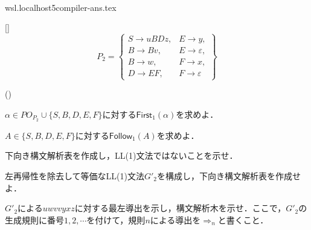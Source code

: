 \\wsl.localhost\Ubuntu-26.04\home\yuen\github\25compiler\exercises\ex241011\ex241011-ans.tex\documentclass[dvipdfmx]{jarticle}
\newcounter{coffee}
\newcounter{bean}
\begin{document}
\begin{list}{[]}{}
        \[P_2=\left\{\begin{array}{ll}
            S\rightarrow uBDz , & E\rightarrow y          , \\
            B\rightarrow Bv   , & E\rightarrow\varepsilon , \\
            B\rightarrow w    , & F\rightarrow x          , \\
            D\rightarrow EF   , & F\rightarrow\varepsilon
          \end{array}\right\}\]

        \begin{list}{()}{}
          \item $\alpha\in PO_{P_2}\cup\{S,B,D,E,F\}$に対する$\mathsf{First}_1(\alpha)$を求めよ．
          \item $A\in\{S,B,D,E,F\}$に対する$\mathsf{Follow}_1(A)$を求めよ．
          \item 下向き構文解析表を作成し，LL(1)文法ではないことを示せ．
          \item 左再帰性を除去して等価なLL(1)文法$G'_2$を構成し，下向き構文解析表を作成せよ．
          \item $G'_2$による$uwvvyxz$に対する最左導出を示し，構文解析木を示せ．ここで，$G'_2$の生成規則に番号$1,2,\cdots$を付けて，規則$n$による導出を${\Rightarrow}_{n}$と書くこと．
        \end{list}
\end{list}
\end{document}
